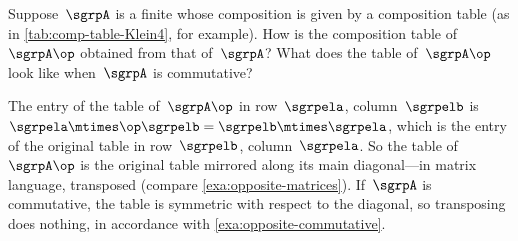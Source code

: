 \begin{exercise}
    \label{ex:opposite-composition-table}
    Suppose~$\sgrpA$ is a finite  whose composition is given by a composition table (as in \cref{tab:comp-table-Klein4}, for example).
    How is the composition table of~$\sgrpA\op$ obtained from that of~$\sgrpA$?
    What does the table of~$\sgrpA\op$ look like when~$\sgrpA$ is commutative?
\end{exercise}
\begin{solution}
    The entry of the table of~$\sgrpA\op$ in row~$\sgrpela$, column~$\sgrpelb$ is~$\sgrpela \mtimes\op \sgrpelb = \sgrpelb \mtimes \sgrpela$, which is the entry of the original table in row~$\sgrpelb$, column~$\sgrpela$.
    So the table of~$\sgrpA\op$ is the original table mirrored along its main diagonal---in matrix language, transposed (compare \cref{exa:opposite-matrices}).
    If~$\sgrpA$ is commutative, the table is symmetric with respect to the diagonal, so transposing does nothing, in accordance with \cref{exa:opposite-commutative}.
\end{solution}
